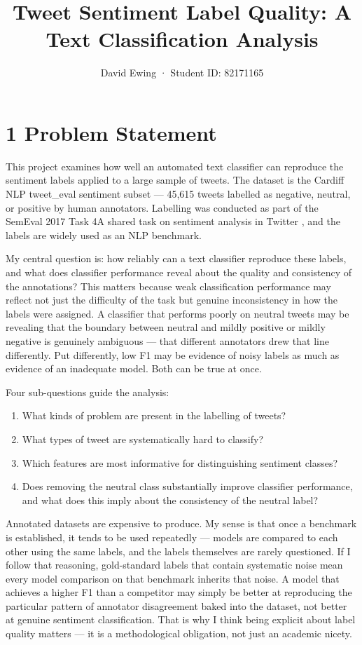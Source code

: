 \documentclass[12pt]{article}
\title{Tweet Sentiment Label Quality: A Text Classification Analysis}
\author{David Ewing · Student ID: 82171165}
\date{}
\begin{document}
\maketitle

\section*{1 Problem Statement}

This project examines how well an automated text classifier can reproduce the sentiment labels applied to a large sample of tweets. The dataset is the Cardiff NLP tweet\_eval sentiment subset --- 45,615 tweets labelled as negative, neutral, or positive by human annotators. Labelling was conducted as part of the SemEval 2017 Task 4A shared task on sentiment analysis in Twitter \citep{rosenthal2017semeval}, and the labels are widely used as an NLP benchmark.

My central question is: how reliably can a text classifier reproduce these labels, and what does classifier performance reveal about the quality and consistency of the annotations? This matters because weak classification performance may reflect not just the difficulty of the task but genuine inconsistency in how the labels were assigned. A classifier that performs poorly on neutral tweets may be revealing that the boundary between neutral and mildly positive or mildly negative is genuinely ambiguous --- that different annotators drew that line differently. Put differently, low F1 may be evidence of noisy labels as much as evidence of an inadequate model. Both can be true at once.

Four sub-questions guide the analysis:
\begin{enumerate}
  \item What kinds of problem are present in the labelling of tweets?
  \item What types of tweet are systematically hard to classify?
  \item Which features are most informative for distinguishing sentiment classes?
  \item Does removing the neutral class substantially improve classifier performance, and what does this imply about the consistency of the neutral label?
\end{enumerate}

Annotated datasets are expensive to produce. My sense is that once a benchmark is established, it tends to be used repeatedly --- models are compared to each other using the same labels, and the labels themselves are rarely questioned. If I follow that reasoning, gold-standard labels that contain systematic noise mean every model comparison on that benchmark inherits that noise. A model that achieves a higher F1 than a competitor may simply be better at reproducing the particular pattern of annotator disagreement baked into the dataset, not better at genuine sentiment classification. That is why I think being explicit about label quality matters --- it is a methodological obligation, not just an academic nicety.
\end{document}
